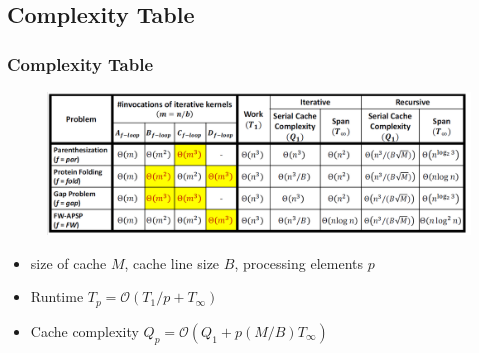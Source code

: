 \subsection{Complexity Table}
\begin{frame}
    \frametitle{Complexity Table}
    \begin{figure}
		\includegraphics[scale=0.25]{figure/fig-complexity.png}
	\end{figure}
    \begin{itemize}
		\item size of cache $M$, cache line size $B$, processing elements $p$
		\item Runtime $T_p = \mathcal{O}(T_1/p + T_{\infty})$
		\item Cache complexity $Q_p = \mathcal{O}(Q_1 + p(M/B) T_{\infty})$
	\end{itemize}
\end{frame}